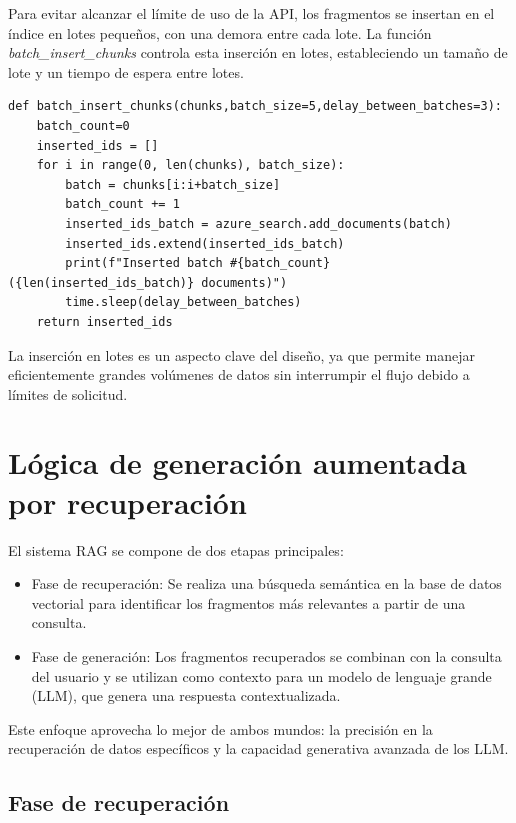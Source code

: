 Para evitar alcanzar el límite de uso de la API, los fragmentos se insertan en el índice en lotes pequeños, con una demora entre cada lote. 
La función \textit{batch\_insert\_chunks} controla esta inserción en lotes, estableciendo un tamaño de lote y un tiempo de espera entre lotes.

\begin{lstlisting}[label=cod:update-db-6,caption=Inserción en lotes.]
	def batch_insert_chunks(chunks,batch_size=5,delay_between_batches=3):
    batch_count=0
    inserted_ids = []
    for i in range(0, len(chunks), batch_size):
        batch = chunks[i:i+batch_size]
        batch_count += 1
        inserted_ids_batch = azure_search.add_documents(batch)
        inserted_ids.extend(inserted_ids_batch)
        print(f"Inserted batch #{batch_count} ({len(inserted_ids_batch)} documents)")
        time.sleep(delay_between_batches)
    return inserted_ids
\end{lstlisting}

La inserción en lotes es un aspecto clave del diseño, ya que permite manejar eficientemente grandes volúmenes de datos sin interrumpir
el flujo debido a límites de solicitud.

\vspace{8mm}

\section{Lógica de generación aumentada por recuperación}

El sistema RAG se compone de dos etapas principales:

\begin{itemize}
	\item Fase de recuperación: Se realiza una búsqueda semántica en la base de datos vectorial para identificar 
	los fragmentos más relevantes a partir de una consulta.
	\item Fase de generación: Los fragmentos recuperados se combinan con la consulta del usuario y se utilizan 
	como contexto para un modelo de lenguaje grande (LLM), que genera una respuesta contextualizada.
\end{itemize}

Este enfoque aprovecha lo mejor de ambos mundos: la precisión en la recuperación de datos específicos y 
la capacidad generativa avanzada de los LLM.

\subsection{Fase de recuperación}

